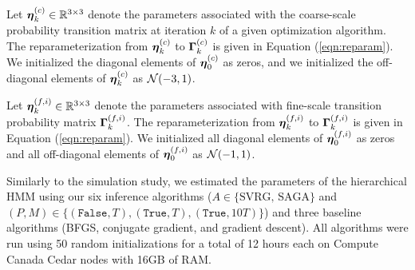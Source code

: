 Let $\boldsymbol{\eta}_k^{(c)} \in \mathbb{R}^{3 \times 3}$ denote the parameters associated with the coarse-scale probability transition matrix at iteration $k$ of a given optimization algorithm. The reparameterization from $\boldsymbol{\eta}_k^{(c)}$ to $\boldsymbol{\Gamma}_k^{(c)}$ is given in Equation (\ref{eqn:reparam}). We initialized the diagonal elements of $\boldsymbol{\eta}_0^{(c)}$ as zeros, and we initialized the off-diagonal elements of $\boldsymbol{\eta}_k^{(c)}$ as $\mathcal{N}(-3,1)$.

Let $\boldsymbol{\eta}_k^{(f,i)} \in \mathbb{R}^{3 \times 3}$ denote the parameters associated with fine-scale transition probability matrix $\boldsymbol{\Gamma}_k^{(f,i)}$. The reparameterization from $\boldsymbol{\eta}_k^{(f,i)}$ to $\boldsymbol{\Gamma}_k^{(f,i)}$ is given in Equation (\ref{eqn:reparam}). We initialized all diagonal elements of $\boldsymbol{\eta}_0^{(f,i)}$ as zeros and all off-diagonal elements of $\boldsymbol{\eta}_0^{(f,i)}$ as $\mathcal{N}(-1,1)$.

%
%
Similarly to the simulation study, we estimated the parameters of the hierarchical HMM using our six inference algorithms ($A \in \{\text{SVRG, SAGA}\}$ and $(P,M) \in \{(\texttt{False},T),(\texttt{True},T),(\texttt{True},10T)\}$) and three baseline algorithms (BFGS, conjugate gradient, and gradient descent).
%
All algorithms were run using 50 random initializations for a total of 12 hours each on Compute Canada Cedar nodes with 16GB of RAM.

